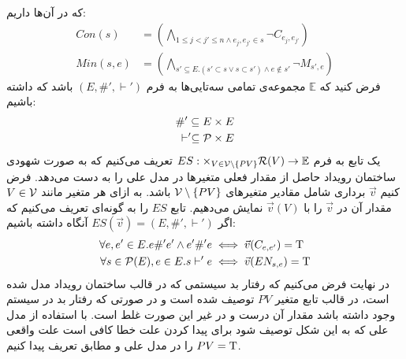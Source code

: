 که در آن‌ها داریم:
\begin{align*}
    Con(s)   & =   \left(
    \bigwedge_{ 1\leq j<j' \leq n \wedge e_j,e_{j'} \in s}
    \neg C_{e_j,e_{j'}}
    \right)               \\
    Min(s,e) & = \left(
    \bigwedge_{s' \subseteq E. (s' \subset s \vee s \subset s')
        \wedge e \notin s'}
    \neg M_{s',e}
    \right)
\end{align*}
فرض کنید که
$\mathbb{E}$
مجموعه‌ی تمامی سه‌تایی‌ها به فرم
$(E,\#',\vdash')$
باشد که داشته باشیم:
\begin{align*}
    \#' \subseteq E \times E \\
    \vdash' \subseteq \mathcal{P}\times E
\end{align*}
یک تابع به فرم
$ES: \times_{V \in \mathcal{V}\setminus \{PV\}} \mathcal{R}(V) \rightarrow \mathbb{E}$
تعریف می‌کنیم که به صورت شهودی ساختمان رویداد حاصل از مقدار فعلی متغیر‌ها در مدل علی را به دست می‌دهد.
فرض کنیم 
$\vec v$
برداری شامل مقادیر متغیرهای
$\mathcal{V} \setminus \{PV\}$
باشد.
به ازای هر متغیر مانند 
$V \in \mathcal{V}$
مقدار آن در 
$\vec v$
را با
$\vec v(V)$
نمایش می‌دهیم.
تابع 
$ES$
را به گونه‌ای تعریف می‌کنیم که اگر 
$ES(\vec v) = (E,\#',\vdash')$
آنگاه داشته باشیم:
\begin{align*}
    \forall e,e' \in E. e \#' e' \wedge e' \#' e
     & \iff \vec{v}(C_{e,e'}) = \mathrm{T} \\
    \forall s \in \mathcal{P}(E), e \in E.  s \vdash' e
     & \iff \vec{v}(EN_{s,e}) = \mathrm{T}
\end{align*}
در نهایت فرض می‌کنیم که رفتار بد سیستمی که در قالب ساختمان رویداد مدل شده است، در قالب تابع متغیر 
$PV$
توصیف شده است و در صورتی که رفتار بد در سیستم وجود داشته باشد مقدار آن درست و در غیر این صورت غلط است.
با استفاده از مدل علی که به این شکل توصیف شود برای پیدا کردن علت خطا کافی است علت واقعی 
$PV=\mathrm{T}$
را در مدل علی و مطابق تعریف پیدا کنیم.

